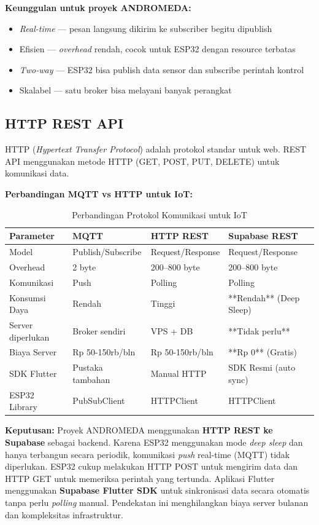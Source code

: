 \documentclass[12pt,a4paper,oneside]{report}
\begin{document}
\textbf{Keunggulan untuk proyek ANDROMEDA:}
\begin{itemize}
    \item \textit{Real-time} — pesan langsung dikirim ke subscriber begitu dipublish
    \item Efisien — \textit{overhead} rendah, cocok untuk ESP32 dengan resource terbatas
    \item \textit{Two-way} — ESP32 bisa publish data sensor dan subscribe perintah kontrol
    \item Skalabel — satu broker bisa melayani banyak perangkat
\end{itemize}

\subsection{HTTP REST API}

HTTP (\textit{Hypertext Transfer Protocol}) adalah protokol standar untuk web. REST API menggunakan metode HTTP (GET, POST, PUT, DELETE) untuk komunikasi data.

\textbf{Perbandingan MQTT vs HTTP untuk IoT:}

\begin{table}[H]
\centering
\caption{Perbandingan Protokol Komunikasi untuk IoT}
\label{tab:mqtt-http}
\begin{tabular}{p{3cm} p{4.5cm} p{4.5cm} p{3cm}}
\toprule
\textbf{Parameter} & \textbf{MQTT} & \textbf{HTTP REST} & \textbf{Supabase REST} \\
\midrule
Model & Publish/Subscribe & Request/Response & Request/Response \\
Overhead & 2 byte & 200--800 byte & 200--800 byte \\
Komunikasi & Push & Polling & Polling \\
Konsumsi Daya & Rendah & Tinggi & **Rendah** (Deep Sleep) \\
Server diperlukan & Broker sendiri & VPS + DB & **Tidak perlu** \\
Biaya Server & Rp 50-150rb/bln & Rp 50-150rb/bln & **Rp 0** (Gratis) \\
SDK Flutter & Pustaka tambahan & Manual HTTP & SDK Resmi (auto sync) \\
ESP32 Library & PubSubClient & HTTPClient & HTTPClient \\
\bottomrule
\end{tabular}
\end{table}

\textbf{Keputusan:} Proyek ANDROMEDA menggunakan \textbf{HTTP REST ke Supabase} sebagai backend. Karena ESP32 menggunakan mode \textit{deep sleep} dan hanya terbangun secara periodik, komunikasi \textit{push} real-time (MQTT) tidak diperlukan. ESP32 cukup melakukan HTTP POST untuk mengirim data dan HTTP GET untuk memeriksa perintah yang tertunda. Aplikasi Flutter menggunakan \textbf{Supabase Flutter SDK} untuk sinkronisasi data secara otomatis tanpa perlu \textit{polling} manual. Pendekatan ini menghilangkan biaya server bulanan dan kompleksitas infrastruktur.
\end{document}

